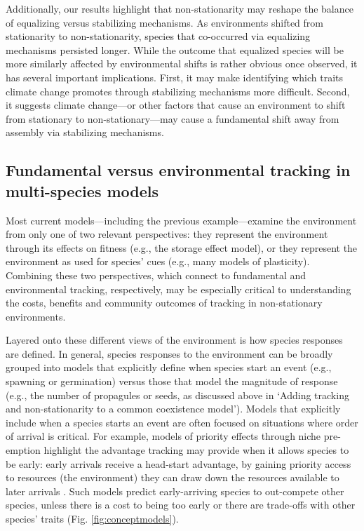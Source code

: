 \documentclass[11pt,letterpaper]{article}
\begin{document}
Additionally, our results highlight that non-stationarity may reshape the balance of equalizing versus stabilizing mechanisms. As environments shifted from stationarity to non-stationarity, species that co-occurred via equalizing mechanisms persisted longer. While the outcome that equalized species will be more similarly affected by environmental shifts is rather obvious once observed, it has several important implications. First, it may make identifying which traits climate change promotes through stabilizing mechanisms more difficult. Second, it suggests climate change---or other factors that cause an environment to shift from stationary to non-stationary---may cause a fundamental shift away from assembly via stabilizing mechanisms. %

\subsection{Fundamental versus environmental tracking in multi-species models}
Most current models---including the previous example---examine the environment from only one of two relevant perspectives: they represent the environment through its effects on fitness (e.g., the storage effect model), or they represent the environment as used for species' cues (e.g., many models of plasticity). Combining these two perspectives, which connect to fundamental and environmental tracking, respectively, may be especially critical to understanding the costs, benefits and community outcomes of tracking in non-stationary environments. 

Layered onto these different views of the environment is how species responses are defined. In general, species responses to the environment can be broadly grouped into models that explicitly define when species start an event (e.g., spawning or germination) versus those that model the magnitude of response (e.g., the number of propagules or seeds, as discussed above in `Adding tracking and non-stationarity to a common coexistence model'). Models that explicitly include when a species starts an event are often focused on situations where order of arrival is critical. For example, models of priority effects through niche pre-emption highlight the advantage tracking may provide when it allows species to be early: early arrivals receive a head-start advantage, by gaining priority access to resources (the environment) they can draw down the resources available to later arrivals \citep{fukami2015}. Such models predict early-arriving species to out-compete other species, unless there is a cost to being too early or there are trade-offs with other species' traits (Fig. \ref{fig:conceptmodels}).
\end{document}
